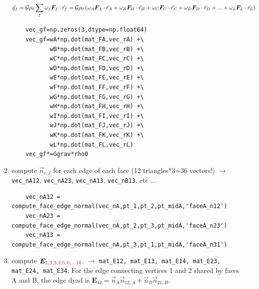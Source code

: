 \begin{enumerate}
\[
\vec{g}_f
= {\cal G} \rho_0 \sum_f \omega_f {\bm F}_f\cdot \vec{r}_f 
= {\cal G} \rho_0 \left(
\omega_A {\bm F}_A\cdot \vec{r}_A +
\omega_B {\bm F}_B\cdot \vec{r}_B +
\omega_C {\bm F}_C\cdot \vec{r}_C +
\omega_D {\bm F}_D\cdot \vec{r}_D +
...+
\omega_L {\bm F}_L \cdot \vec{r}_L
\right)
\]

{\tiny
\begin{lstlisting}
    vec_gf=np.zeros(3,dtype=np.float64)
    vec_gf=wA*np.dot(mat_FA,vec_rA) +\
           wB*np.dot(mat_FB,vec_rB) +\
           wC*np.dot(mat_FC,vec_rC) +\
           wD*np.dot(mat_FD,vec_rD) +\
           wE*np.dot(mat_FE,vec_rE) +\
           wF*np.dot(mat_FF,vec_rF) +\
           wG*np.dot(mat_FG,vec_rG) +\
           wH*np.dot(mat_FH,vec_rH) +\
           wI*np.dot(mat_FI,vec_rI) +\
           wJ*np.dot(mat_FJ,vec_rJ) +\
           wK*np.dot(mat_FK,vec_rK) +\
           wL*np.dot(mat_FL,vec_rL)
    vec_gf*=Ggrav*rho0
\end{lstlisting}
}


\item compute $\vec{n}_{e,f}$ for each edge of each face (12 triangles*3=36 vectors!)
$\rightarrow$ \verb|vec_nA12|, \verb|vec_nA23|, \verb|vec_nA13|, \verb|vec_nB13|, etc ...

{\tiny
\begin{lstlisting}
    vec_nA12 = compute_face_edge_normal(vec_nA,pt_1,pt_2,pt_midA,'faceA_n12')
    vec_nA23 = compute_face_edge_normal(vec_nA,pt_2,pt_3,pt_midA,'faceA_n23')
    vec_nA13 = compute_face_edge_normal(vec_nA,pt_3,pt_1,pt_midA,'faceA_n31')
\end{lstlisting}
}




\item compute ${\bm E}_{\color{purple} 1,2,3,4,5,6,...18}$.
$\rightarrow$ \verb|mat_E12, mat_E13, mat_E14, mat_E23, mat_E24, mat_E34|.
For the edge connecting vertices 1 and 2 shared by faces A and B,
the edge dyad is ${\bm E}_{12}=\vec{n}_A \vec{n}_{12,A}+\vec{n}_B \vec{n}_{21,B}$.



\end{enumerate}
